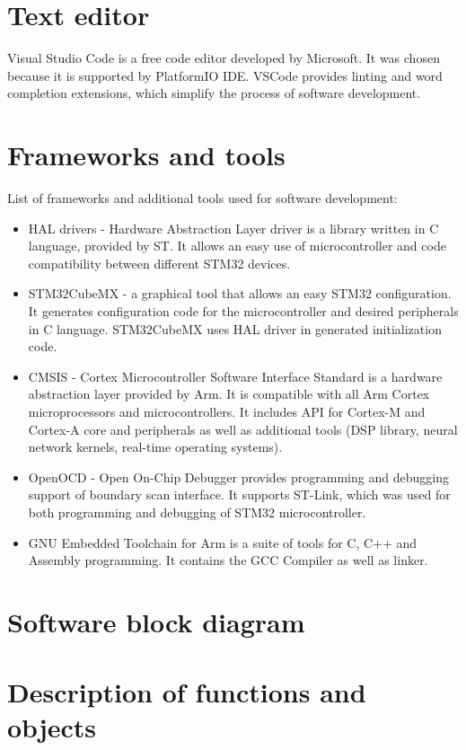 \documentclass[a4paper,twoside,12pt]{book}
\begin{document}
\section{Text editor}
Visual Studio Code is a free code editor developed by Microsoft.
It was chosen because it is supported by PlatformIO IDE.
VSCode provides linting and word completion extensions,
which simplify the process of software development.

\section{Frameworks and tools}
List of frameworks and additional tools used for software development:

\begin{itemize}
    \item HAL drivers
    - Hardware Abstraction Layer driver is a library written in C language, provided by ST.
    It allows an easy use of microcontroller and code compatibility between different STM32 devices.
    \item STM32CubeMX
    - a graphical tool that allows an easy STM32 configuration.
    It generates configuration code for the microcontroller and desired peripherals in C language.
    STM32CubeMX uses HAL driver in generated initialization code.
    \item CMSIS
    - Cortex Microcontroller Software Interface Standard
    is a hardware abstraction layer provided by Arm.
    It is compatible with all Arm Cortex microprocessors and microcontrollers.
    It includes API for Cortex-M and Cortex-A core and peripherals as well as additional tools
    (DSP library, neural network kernels, real-time operating systems).
    \item OpenOCD
    - Open On-Chip Debugger provides programming and debugging support of boundary scan interface.
    It supports ST-Link, which was used for both programming and debugging of STM32 microcontroller.
    \item GNU Embedded Toolchain for Arm
    is a suite of tools for C, C++ and Assembly programming.
    It contains the GCC Compiler as well as linker.
\end{itemize}

\section{Software block diagram}

\section{Description of functions and objects}
\end{document}
